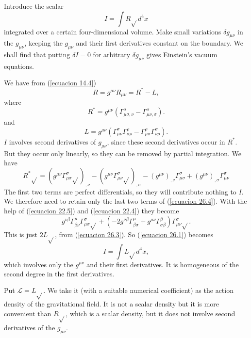 Introduce the scalar
\begin{equation}
 \label{ecuacion 26.1}
 I = \int{R \sqrt{} d^4 x}
\end{equation}
integrated over a certain four-dimensional volume. Make small variations $\delta g_{\mu\nu}$ in the $g_{\mu\nu}$, 
keeping the $g_{\mu\nu}$ and their first derivatives constant on the boundary. We shall find that putting $\delta I = 
0$ for arbitrary $\delta g_{\mu\nu}$ gives Einstein's vacuum equations.

We have from (\ref{ecuacion 14.4})
\[
 R = g^{\mu\nu} R_{\mu\nu} = R^{*} - L,
\]
where
\begin{equation}
 \label{ecuacion 26.2}
 R^{*} = g^{\mu\nu} \left( \Gamma^\sigma_{\mu\sigma,\nu} - \Gamma^\sigma_{\mu\nu,\sigma} \right).
\end{equation}
and
\begin{equation}
 \label{ecuacion 26.3}
 L = g^{\mu\nu} \left( 
    \Gamma^\sigma_{\mu\nu}\Gamma^\rho_{\sigma\rho} - \Gamma^\rho_{\mu\sigma}\Gamma^\sigma_{\nu\rho}
 \right).
\end{equation}
$I$ involves second derivatives of $g_{\mu\nu}$, since these second derivatives occur in $R^{*}$. But they occur only 
linearly, so they can be removed by partial integration. We have
\begin{equation}
 \label{ecuacion 26.4}
 R^{*}\sqrt{} = \left( 
    g^{\mu\nu} \Gamma^\sigma_{\mu\sigma} \sqrt{}
 \right)_{,\nu} -
 \left( 
    g^{\mu\nu} \Gamma^\sigma_{\mu\nu} \sqrt{}
 \right)_{,\sigma}
 -\left(
    g^{\mu\nu}
 \right)_{,\nu} \Gamma^\sigma_{\mu\sigma}
 +\left(
    g^{\mu\nu}
 \right)_{,\sigma} \Gamma^\sigma_{\mu\nu}
\end{equation}
The first two terms are perfect differentials, so they will contribute nothing to $I$. We therefore need to retain only 
the last two terms of (\ref{ecuacion 26.4}). With the help of (\ref{ecuacion 22.5}) and (\ref{ecuacion 22.4}) they 
become
\[
 g^{\nu\beta}\Gamma^\mu_{\beta\nu}\Gamma^\sigma_{\mu\sigma}\sqrt{}
 + \left(
     -2 g^{\nu\beta} \Gamma^\mu_{\beta\sigma} + g^{\mu\nu} \Gamma^\beta_{\sigma\beta}
 \right)
 \Gamma^\sigma_{\mu\nu} \sqrt{}.
\]
This is just $2L\sqrt{}$, from (\ref{ecuacion 26.3}). So (\ref{ecuacion 26.1}) becomes
\[
 I = \int{L\sqrt{} d^4 x},
\]
which involves only the $g^{\mu\nu}$ and their first derivatives. It is homogeneous of the second degree in the first 
derivatives.

Put $\mathcal{L} = L \sqrt{}$. We take it (with a suitable numerical coefficient) as the action density of the 
gravitational field. It is not a scalar density but it is more convenient than $R\sqrt{}$, which is a scalar density, 
but it does not involve second derivatives of the $g_{\mu\nu}$.


